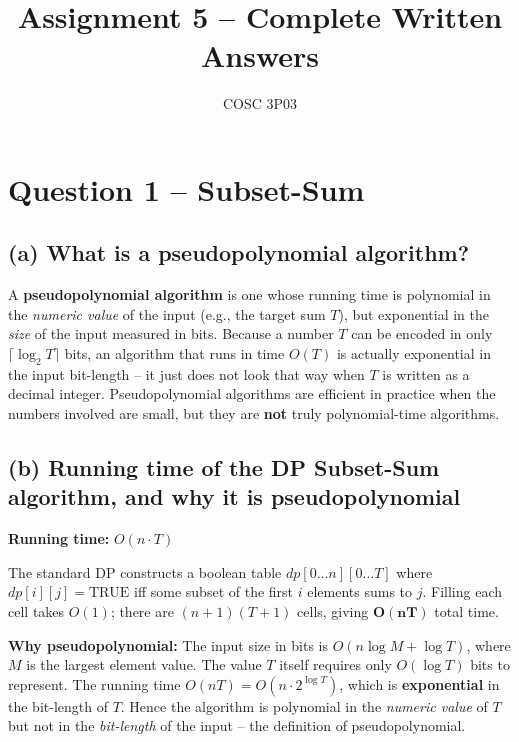 \documentclass[12pt]{article}
\title{Assignment 5 -- Complete Written Answers}
\author{COSC 3P03}
\date{}
\begin{document}
\maketitle

\section*{Question 1 -- Subset-Sum}

\subsection*{(a) What is a pseudopolynomial algorithm?}

A \textbf{pseudopolynomial algorithm} is one whose running time is polynomial
in the \emph{numeric value} of the input (e.g., the target sum $T$), but
exponential in the \emph{size} of the input measured in bits.  Because a
number $T$ can be encoded in only $\lceil\log_2 T\rceil$ bits, an algorithm
that runs in time $O(T)$ is actually exponential in the input bit-length --
it just does not look that way when $T$ is written as a decimal integer.
Pseudopolynomial algorithms are efficient in practice when the numbers
involved are small, but they are \textbf{not} truly polynomial-time
algorithms.

\subsection*{(b) Running time of the DP Subset-Sum algorithm, and why it is pseudopolynomial}

\textbf{Running time:} $O(n \cdot T)$

The standard DP constructs a boolean table $\mathit{dp}[0\ldots n][0\ldots T]$
where $\mathit{dp}[i][j] = \mathrm{TRUE}$ iff some subset of the first $i$
elements sums to $j$.  Filling each cell takes $O(1)$; there are
$(n+1)(T+1)$ cells, giving $\mathbf{O(nT)}$ total time.

\textbf{Why pseudopolynomial:}  The input size in bits is
$O(n\log M + \log T)$, where $M$ is the largest element value.  The value
$T$ itself requires only $O(\log T)$ bits to represent.  The running time
$O(nT) = O(n \cdot 2^{\log T})$, which is \textbf{exponential} in the
bit-length of $T$.  Hence the algorithm is polynomial in the \emph{numeric
value} of $T$ but not in the \emph{bit-length} of the input -- the
definition of pseudopolynomial.
\end{document}
